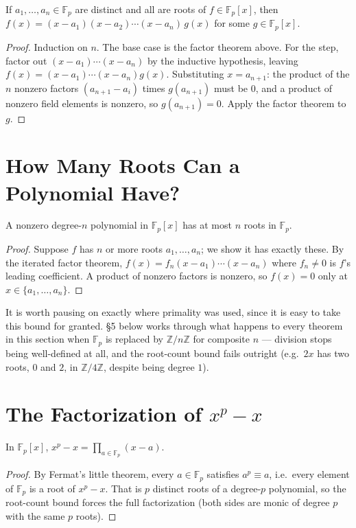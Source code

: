 \documentclass[11pt]{article}
\begin{document}
\begin{theorembox}
If $a_1,\ldots,a_n \in \mathbb{F}_p$ are distinct and all are roots of
$f \in \mathbb{F}_p[x]$, then
$f(x) = (x-a_1)(x-a_2)\cdots(x-a_n)\,g(x)$ for some
$g \in \mathbb{F}_p[x]$.
\end{theorembox}
\begin{proof}
Induction on $n$. The base case is the factor theorem above. For the
step, factor out $(x-a_1)\cdots(x-a_n)$ by the inductive hypothesis,
leaving $f(x) = (x-a_1)\cdots(x-a_n)g(x)$. Substituting $x = a_{n+1}$: the
product of the $n$ nonzero factors $(a_{n+1}-a_i)$ times $g(a_{n+1})$
must be $0$, and a product of nonzero field elements is nonzero, so
$g(a_{n+1}) = 0$. Apply the factor theorem to $g$.
\end{proof}

\section{How Many Roots Can a Polynomial Have?}
\begin{theorembox}
A nonzero degree-$n$ polynomial in $\mathbb{F}_p[x]$ has at most $n$
roots in $\mathbb{F}_p$.
\end{theorembox}
\begin{proof}
Suppose $f$ has $n$ or more roots $a_1,\ldots,a_n$; we show it has
exactly these. By the iterated factor theorem,
$f(x) = f_n(x-a_1)\cdots(x-a_n)$ where $f_n \ne 0$ is $f$'s leading
coefficient. A product of nonzero factors is nonzero, so $f(x) = 0$ only
at $x \in \{a_1,\ldots,a_n\}$.
\end{proof}

\begin{notebox}
It is worth pausing on exactly where primality was used, since it is easy
to take this bound for granted. \S5 below works through what happens to
every theorem in this section when $\mathbb{F}_p$ is replaced by
$\mathbb{Z}/n\mathbb{Z}$ for composite $n$ --- division stops being
well-defined at all, and the root-count bound fails outright (e.g.\ $2x$
has two roots, $0$ and $2$, in $\mathbb{Z}/4\mathbb{Z}$, despite being
degree $1$).
\end{notebox}

\section{The Factorization of \texorpdfstring{$x^p - x$}{x\^{}p - x}}
\begin{theorembox}
In $\mathbb{F}_p[x]$, $\displaystyle x^p - x = \prod_{a \in \mathbb{F}_p}
(x - a)$.
\end{theorembox}
\begin{proof}
By Fermat's little theorem, every $a \in \mathbb{F}_p$ satisfies
$a^p \equiv a$, i.e.\ every element of $\mathbb{F}_p$ is a root of
$x^p-x$. That is $p$ distinct roots of a degree-$p$ polynomial, so the
root-count bound forces the full factorization (both sides are monic of
degree $p$ with the same $p$ roots).
\end{proof}
\end{document}
